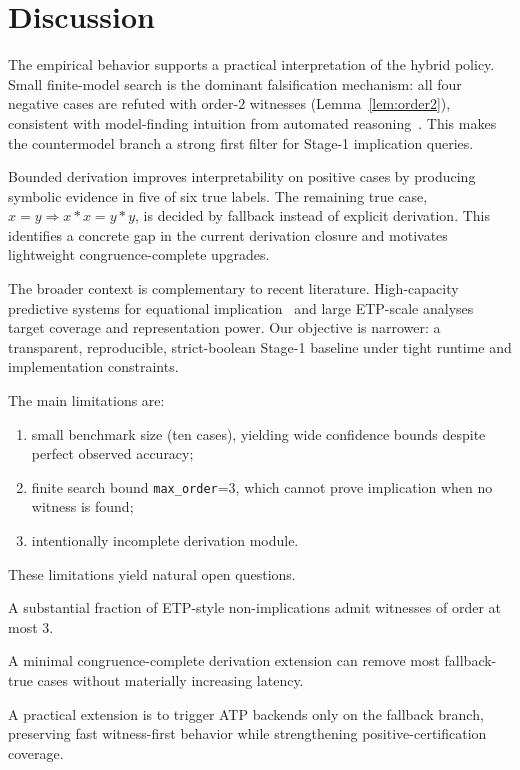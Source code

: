 \section{Discussion}

The empirical behavior supports a practical interpretation of the hybrid policy. Small finite-model search is the dominant falsification mechanism: all four negative cases are refuted with order-$2$ witnesses (Lemma~\ref{lem:order2}), consistent with model-finding intuition from automated reasoning~\cite{mccune2003mace4}. This makes the countermodel branch a strong first filter for Stage-1 implication queries.

Bounded derivation improves interpretability on positive cases by producing symbolic evidence in five of six true labels. The remaining true case, $x=y\Rightarrow x\ast x=y\ast y$, is decided by fallback instead of explicit derivation. This identifies a concrete gap in the current derivation closure and motivates lightweight congruence-complete upgrades.

The broader context is complementary to recent literature. High-capacity predictive systems for equational implication~\cite{piepenbrock2021learning,axelrod2026twitch} and large ETP-scale analyses~\cite{bolan2025etp,berlioz2026latent} target coverage and representation power. Our objective is narrower: a transparent, reproducible, strict-boolean Stage-1 baseline under tight runtime and implementation constraints.

The main limitations are:
\begin{enumerate}[leftmargin=*]
\item small benchmark size (ten cases), yielding wide confidence bounds despite perfect observed accuracy;
\item finite search bound \texttt{max\_order}=3, which cannot prove implication when no witness is found;
\item intentionally incomplete derivation module.
\end{enumerate}

These limitations yield natural open questions.
\begin{conjecture}
A substantial fraction of ETP-style non-implications admit witnesses of order at most $3$.
\end{conjecture}

\begin{conjecture}
A minimal congruence-complete derivation extension can remove most fallback-true cases without materially increasing latency.
\end{conjecture}

A practical extension is to trigger ATP backends only on the fallback branch, preserving fast witness-first behavior while strengthening positive-certification coverage.
